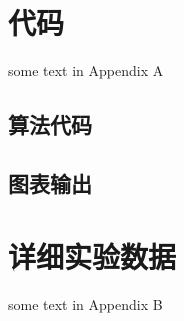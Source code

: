 \begin{appendices}
    \section{代码}
    some text in Appendix A
    \subsection{算法代码}
    \subsection{图表输出}
    \section{详细实验数据}
    some text in Appendix B
\end{appendices}
